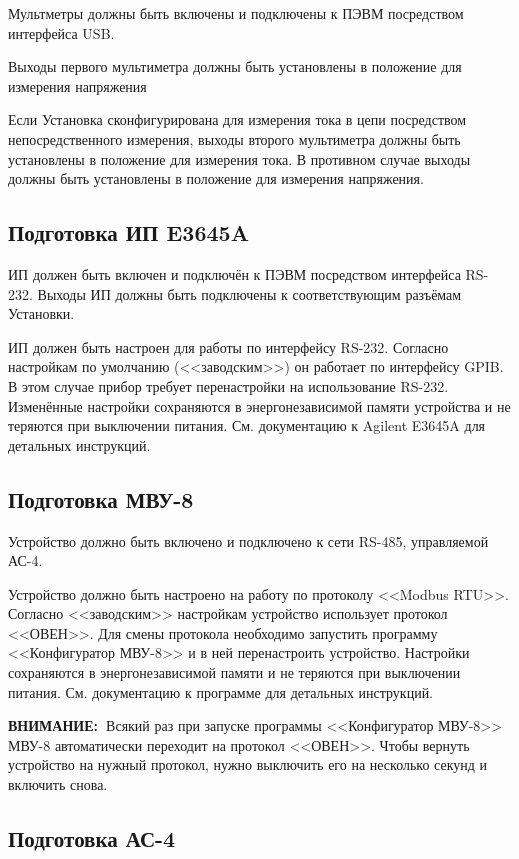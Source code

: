 \documentclass[12pt, a4paper, twocolumn]{report}
\newcommand{\IMPORTANT}{

{\bf ВНИМАНИЕ:~}}
\begin{document}
Мультметры должны быть включены и подключены к ПЭВМ посредством интерфейса USB.

Выходы первого мультиметра должны быть установлены в положение для измерения напряжения

Если Установка сконфигурирована для измерения тока в цепи посредством непосредственного измерения, выходы второго мультиметра должны быть установлены в положение для измерения тока. В противном случае выходы должны быть установлены в положение для измерения напряжения.

\subsection{Подготовка ИП E3645A}

ИП должен быть включен и подключён к ПЭВМ посредством интерфейса RS-232. Выходы ИП должны быть подключены к соответствующим разъёмам Установки.

ИП должен быть настроен для работы по интерфейсу RS-232. Согласно настройкам по умолчанию (<<заводским>>) он работает по интерфейсу GPIB. В этом случае прибор требует перенастройки на использование RS-232. Изменённые настройки сохраняются в энергонезависимой памяти устройства и не теряются при выключении питания. См. документацию к Agilent E3645A для детальных инструкций.

\subsection{Подготовка МВУ-8}

Устройство должно быть включено и подключено к сети RS-485, управляемой АС-4.

Устройство должно быть настроено на работу по протоколу <<Modbus RTU>>. Согласно <<заводским>> настройкам устройство использует протокол <<ОВЕН>>. Для смены протокола необходимо запустить программу <<Конфигуратор МВУ-8>> и в ней перенастроить устройство. Настройки сохраняются в энергонезависимой памяти и не теряются при выключении питания. См. документацию к программе для детальных инструкций.

\IMPORTANT Всякий раз при запуске программы <<Конфигуратор МВУ-8>> МВУ-8 автоматически переходит на протокол <<ОВЕН>>. Чтобы вернуть устройство на нужный протокол, нужно выключить его на несколько секунд и включить снова.

\subsection{Подготовка АС-4}
\end{document}
